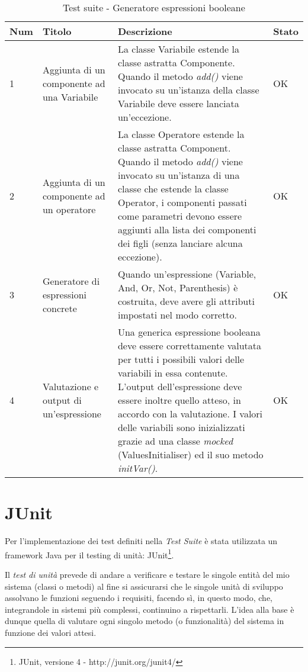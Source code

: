 \begin{table}[h!]
\caption{Test suite - Generatore espressioni booleane}
\centering %
\begin{tabular}{|p{1cm}|p{3cm}|p{7cm}|p{1cm}|} %
\hline\hline %
\textbf{Num} & \textbf{Titolo} & \textbf{Descrizione} & \textbf{Stato} \\ [0.5ex] %
\hline %
1 & Aggiunta di un componente ad una Variabile & La classe Variabile estende la classe astratta Componente. Quando il metodo \emph{add()} viene invocato su un'istanza della classe Variabile deve essere lanciata un'eccezione. & OK \\ \hline%
2 & Aggiunta di un componente ad un operatore & La classe Operatore estende la classe astratta Component. Quando il metodo \emph{add()} viene invocato su un'istanza di una classe che estende la classe Operator, i componenti passati come parametri devono essere aggiunti alla lista dei componenti dei figli (senza lanciare alcuna eccezione). & OK \\ \hline
3 & Generatore di espressioni concrete & Quando un'espressione (Variable, And, Or, Not, Parenthesis) è costruita, deve avere gli attributi impostati nel modo corretto. & OK \\ \hline
4 & Valutazione e output di un'espressione & Una generica espressione booleana deve essere correttamente valutata per tutti i possibili valori delle variabili in essa contenute. L'output dell'espressione deve essere inoltre quello atteso, in accordo con la valutazione. I valori delle variabili sono inizializzati grazie ad una classe \emph{mocked} (ValuesInitialiser) ed il suo metodo \emph{initVar()}. & OK \\ [1ex] %
\hline %
\end{tabular}
\label{table:observerstrategy} 
\end{table}


\section{JUnit}

Per l'implementazione dei test definiti nella \emph{Test Suite} è stata utilizzata un framework Java per il testing di unità: JUnit\footnote{JUnit, versione 4 - http://junit.org/junit4/}.

Il \emph{test di unità} prevede di andare a verificare e testare le singole entità del mio sistema (classi o metodi) al fine si assicurarsi che le singole unità di sviluppo assolvano le funzioni seguendo i requisiti, facendo sì, in questo modo, che, integrandole in sistemi più complessi, continuino a rispettarli. 
L'idea alla base è dunque quella di valutare ogni singolo metodo (o funzionalità) del sistema in funzione dei valori attesi.

